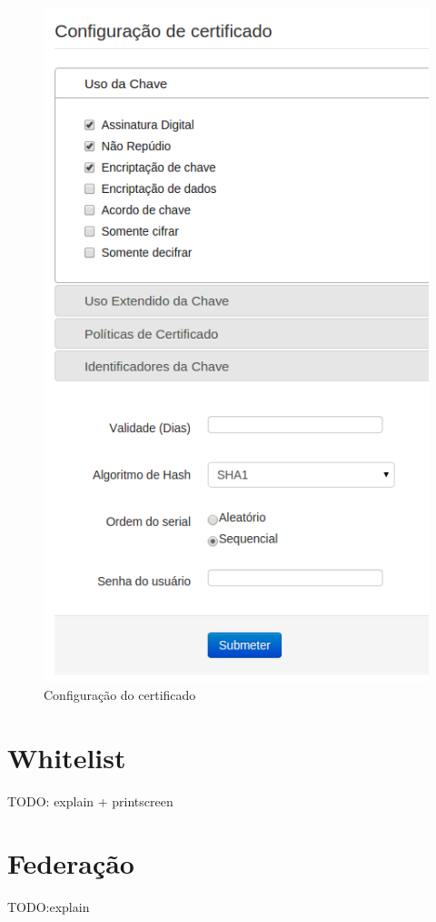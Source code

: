    \begin{figure}[h]
     \centering
     \includegraphics[scale=0.5]{images/configcertificado.png}
     \caption{Configuração do certificado}
     \label{fig:configcertificado}
\end{figure}


\section{Whitelist}
TODO: explain + printscreen


\section{Federação}
TODO:explain
    
